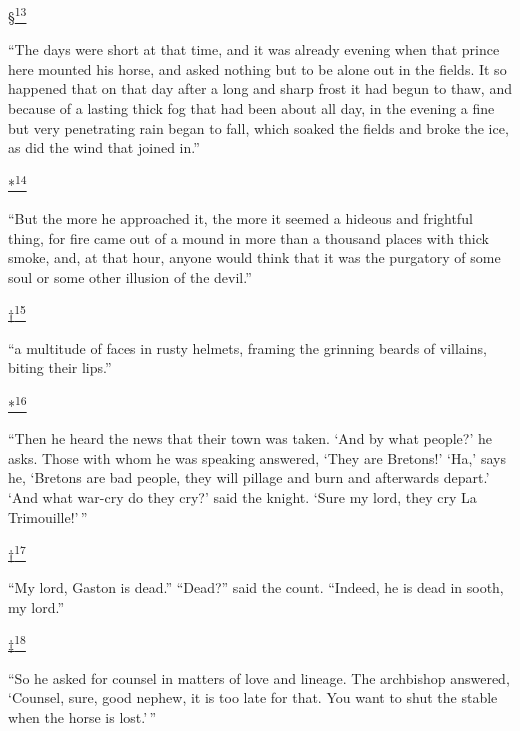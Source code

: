 \protect\hypertarget{23_NOTES.xhtmlux5cux23id_2720}{\protect\hyperlink{21_Chapter_Thirteen__IMAGE_AND_WORD.xhtmlux5cux23id_2719}{§\textsuperscript{13}}}
``The days were short at that time, and it was already evening when that
prince here mounted his horse, and asked nothing but to be alone out in
the fields. It so happened that on that day after a long and sharp frost
it had begun to thaw, and because of a lasting thick fog that had been
about all day, in the evening a fine but very penetrating rain began to
fall, which soaked the fields and broke the ice, as did the wind that
joined in.''

\protect\hypertarget{23_NOTES.xhtmlux5cux23id_2722}{\protect\hyperlink{21_Chapter_Thirteen__IMAGE_AND_WORD.xhtmlux5cux23id_2721}{*\textsuperscript{14}}}
``But the more he approached it, the more it seemed a hideous and
frightful thing, for fire came out of a mound in more than a thousand
places with thick smoke, and, at that hour, anyone would think that it
was the purgatory of some soul or some other illusion of the devil.''

\protect\hypertarget{23_NOTES.xhtmlux5cux23id_2724}{\protect\hyperlink{21_Chapter_Thirteen__IMAGE_AND_WORD.xhtmlux5cux23id_2723}{†\textsuperscript{15}}}
``a multitude of faces in rusty helmets, framing the grinning beards of
villains, biting their lips.''

\protect\hypertarget{23_NOTES.xhtmlux5cux23id_2726}{\protect\hyperlink{21_Chapter_Thirteen__IMAGE_AND_WORD.xhtmlux5cux23id_2725}{*\textsuperscript{16}}}
``Then he heard the news that their town was taken. `And by what
people?' he asks. Those with whom he was speaking answered, `They are
Bretons!' `Ha,' says he, `Bretons are bad people, they will pillage and
burn and afterwards depart.' `And what war-cry do they cry?' said the
knight. `Sure my lord, they cry La Trimouille!'\,''

\protect\hypertarget{23_NOTES.xhtmlux5cux23id_2728}{\protect\hyperlink{21_Chapter_Thirteen__IMAGE_AND_WORD.xhtmlux5cux23id_2727}{†\textsuperscript{17}}}
``My lord, Gaston is dead.'' ``Dead?'' said the count. ``Indeed, he is
dead in sooth, my lord.''

\protect\hypertarget{23_NOTES.xhtmlux5cux23id_2730}{\protect\hyperlink{21_Chapter_Thirteen__IMAGE_AND_WORD.xhtmlux5cux23id_2729}{‡\textsuperscript{18}}}
``So he asked for counsel in matters of love and lineage. The archbishop
answered, `Counsel, sure, good nephew, it is too late for that. You want
to shut the stable when the horse is lost.'\,''


